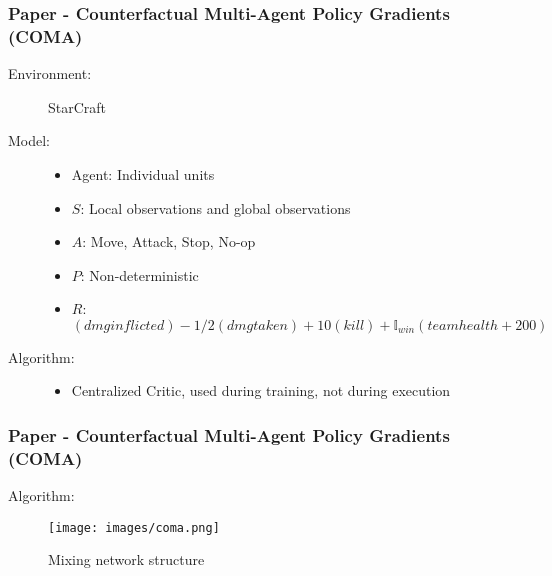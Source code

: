 \documentclass{beamer}
\begin{document}
\begin{frame} %
    \frametitle{Paper \thepapercounter - Counterfactual Multi-Agent Policy Gradients (COMA)
    }
    \begin{description}
        \item[Environment:] StarCraft
        \item[Model:]
        \begin{itemize}
            \item Agent: Individual units
            \item $S$: Local observations and global observations
            \item $A$: Move, Attack, Stop, No-op
            \item $P$: Non-deterministic
            \item $R$: $(dmg inflicted) - 1/2(dmg taken) + 10(kill) 
            + \mathbb{I}_{win}(team health + 200)$
        \end{itemize}
        \item[Algorithm:] 
        \begin{itemize}
            \item Centralized Critic, used during training, not during execution
        \end{itemize}
    \end{description}
\end{frame}

\begin{frame} %
    \frametitle{Paper \thepapercounter - Counterfactual Multi-Agent Policy Gradients (COMA)
    \cite{foerster2018}}
    \begin{description}
        \item[Algorithm:] 
    \end{description}
    \begin{figure}\small
        \texttt{[image: images/coma.png]}
        \caption{Mixing network structure\cite{foerster2018}}
    \end{figure}
\end{frame}
\end{document}
